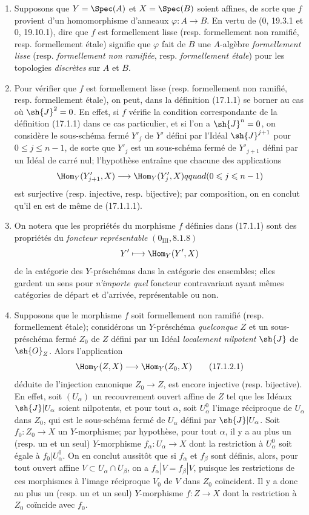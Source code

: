\begin{remarks}[17.1.2]
\label{IV.17.1.2}
\begin{enumerate}
  \item[(i)] Supposons que $Y=\Spec(A)$ et $X=\Spec(B)$ soient affines, de sorte que $f$ provient d'un homomorphisme d'anneaux $\varphi:A\to B$. En vertu de (0, 19.3.1 et 0, 19.10.1), dire que $f$ est formellement lisse (resp. formellement non ramifié, resp. formellement étale) signifie que $\varphi$ fait de $B$ une $A$-algèbre \emph{formellement lisse} (resp. \emph{formellement non ramifiée}, resp. \emph{formellement étale}) pour les topologies \emph{discrètes} sur $A$ et $B$.
  \item[(ii)] Pour vérifier que $f$ est formellement lisse (resp. formellement non ramifié, resp. formellement étale), on peut, dans la définition (17.1.1) se borner au cas où $\sh{J}^2=0$. En effet, si $f$ vérifie la condition correspondante de la définition (17.1.1) dans ce cas particulier, et si l'on a $\sh{J}^n=0$, on considère le sous-schéma fermé $Y'_j$ de $Y'$ défini par l'Idéal $\sh{J}^{j+1}$ pour $0\leq j\leq n-1$, de sorte que $Y'_j$ est un sous-schéma fermé de $Y'_{j+1}$ défini par un Idéal de carré nul; l'hypothèse entraîne que chacune des applications
  \[
    \Hom_Y(Y'_{j+1},X)\longrightarrow\Hom_Y(Y'_j,X)qquad(0\leq j\leq n-1)
  \]
  est surjective (resp. injective, resp. bijective); par composition, on en conclut qu'il en est de même de (17.1.1.1).
  \item[(iii)] On notera que les propriétés du morphisme $f$ définies dans (17.1.1) sont des propriétés du \emph{foncteur représentable} $(0_{\mathrm{III}}, 8.1.8)$
  \[
    Y'\longmapsto\Hom_Y(Y',X)
  \]
  de la catégorie des $Y$-préschémas dans la catégorie des ensembles; elles gardent un sens pour \emph{n'importe quel} foncteur contravariant ayant mêmes catégories de départ et d'arrivée, représentable ou non.
  \item[(iv)] Supposons que le morphisme $f$ soit formellement non ramifié (resp. formellement étale); considérons un $Y$-préschéma \emph{quelconque} $Z$ et un sous-préschéma fermé $Z_0$ de $Z$ défini par un Idéal \emph{localement nilpotent} $\sh{J}$ de $\sh{O}_Z$. Alors l'application
  \[
  \label{IV.17.1.2.1}
    \Hom_Y(Z,X)\longrightarrow\Hom_Y(Z_0,X)
    \tag{17.1.2.1}
  \]
  déduite de l'injection canonique $Z_0\to Z$, est encore injective (resp. bijective). En effet, soit $(U_\alpha)$ un recouvrement ouvert affine de $Z$ tel que les Idéaux $\sh{J}|U_\alpha$ soient nilpotents, et pour tout $\alpha$, soit $U^0_\alpha$ l'image réciproque de $U_\alpha$ dans $Z_0$, qui est le sous-schéma fermé de $U_\alpha$ défini par $\sh{J}|U_\alpha$. Soit $f_0:Z_0\to X$ un $Y$-morphisme; par hypothèse, pour tout $\alpha$, il y a au plus un (resp. un et un seul) $Y$-morphisme $f_\alpha:U_\alpha\to X$ dont la restriction à $U^0_\alpha$ soit égale à $f_0|U^0_\alpha$. On en conclut aussitôt que si $f_\alpha$ et $f_\beta$ sont définis, alors, pour tout ouvert affine $V\subset U_\alpha\cap U_\beta$, on a $f_\alpha|V=f_\beta|V$, puisque les restrictions de ces morphismes à l'image réciproque $V_0$ de $V$ dans $Z_0$ coïncident. Il y a donc au plus un (resp. un et un seul) $Y$-morphisme $f:Z\to X$ dont la restriction à $Z_0$ coïncide avec $f_0$.

\end{enumerate}
\end{remarks}
